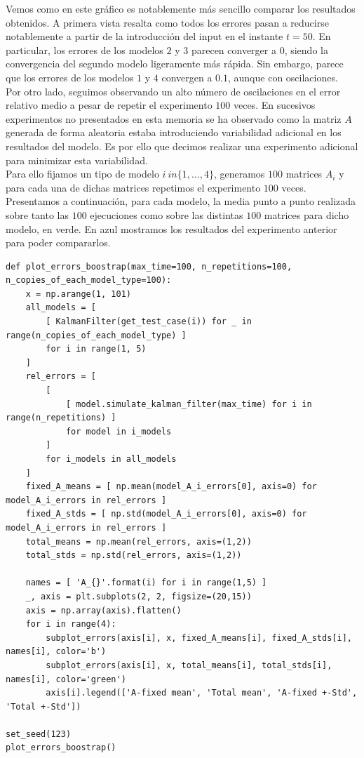 \documentclass[a4paper]{article}
\begin{document}
Vemos como en este gráfico es notablemente más sencillo comparar los resultados obtenidos. A primera vista resalta como todos los errores pasan a reducirse notablemente a partir de la introducción del input en el instante $t=50$. En particular, los errores de los modelos $2$ y $3$ parecen converger a $0$, siendo la convergencia del segundo modelo ligeramente más rápida. Sin embargo, parece que los errores de los modelos $1$ y $4$ convergen a $0.1$, aunque con oscilaciones. \\

Por otro lado, seguimos observando un alto número de oscilaciones en el error relativo medio a pesar de repetir el experimento $100$ veces. En sucesivos experimentos no presentados en esta memoria se ha observado como la matriz $A$ generada de forma aleatoria estaba introduciendo variabilidad adicional en los resultados del modelo. Es por ello que decimos realizar una experimento adicional para minimizar esta variabilidad. \\

Para ello fijamos un tipo de modelo $i \ in \{1, \ldots, 4\}$, generamos $100$ matrices $A_i$ y para cada una de dichas matrices repetimos el experimento $100$ veces. Presentamos a continuación, para cada modelo, la media punto a punto realizada sobre tanto las $100$ ejecuciones como sobre las distintas $100$ matrices para dicho modelo, en verde. En azul mostramos los resultados del experimento anterior para poder compararlos.

\begin{verbatim}
def plot_errors_boostrap(max_time=100, n_repetitions=100, n_copies_of_each_model_type=100):
	x = np.arange(1, 101)
	all_models = [
		[ KalmanFilter(get_test_case(i)) for _ in range(n_copies_of_each_model_type) ]
		for i in range(1, 5)
	]
	rel_errors = [
		[
			[ model.simulate_kalman_filter(max_time) for i in range(n_repetitions) ]
			for model in i_models
		]
		for i_models in all_models
	]
	fixed_A_means = [ np.mean(model_A_i_errors[0], axis=0) for model_A_i_errors in rel_errors ]
	fixed_A_stds = [ np.std(model_A_i_errors[0], axis=0) for model_A_i_errors in rel_errors ]
	total_means = np.mean(rel_errors, axis=(1,2))
	total_stds = np.std(rel_errors, axis=(1,2))
	
	names = [ 'A_{}'.format(i) for i in range(1,5) ]
	_, axis = plt.subplots(2, 2, figsize=(20,15))  
	axis = np.array(axis).flatten()
	for i in range(4):
		subplot_errors(axis[i], x, fixed_A_means[i], fixed_A_stds[i], names[i], color='b')
		subplot_errors(axis[i], x, total_means[i], total_stds[i], names[i], color='green')
		axis[i].legend(['A-fixed mean', 'Total mean', 'A-fixed +-Std', 'Total +-Std'])
	
set_seed(123)
plot_errors_boostrap()
\end{verbatim}
\end{document}
